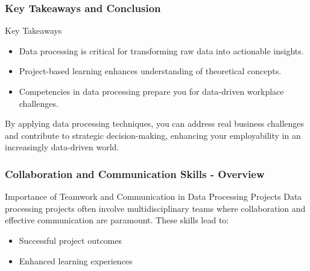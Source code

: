 \documentclass{beamer}
\begin{document}
\begin{frame}[fragile]
    \frametitle{Key Takeaways and Conclusion}
    \begin{block}{Key Takeaways}
        \begin{itemize}
            \item Data processing is critical for transforming raw data into actionable insights.
            \item Project-based learning enhances understanding of theoretical concepts.
            \item Competencies in data processing prepare you for data-driven workplace challenges.
        \end{itemize}
    \end{block}
    
    By applying data processing techniques, you can address real business challenges and contribute to strategic decision-making, enhancing your employability in an increasingly data-driven world.
\end{frame}

\begin{frame}[fragile]
    \frametitle{Collaboration and Communication Skills - Overview}
    \begin{block}{Importance of Teamwork and Communication in Data Processing Projects}
        Data processing projects often involve multidisciplinary teams where collaboration and effective communication are paramount. These skills lead to:
        \begin{itemize}
            \item Successful project outcomes
            \item Enhanced learning experiences
        \end{itemize}
    \end{block}
\end{frame}
\end{document}
